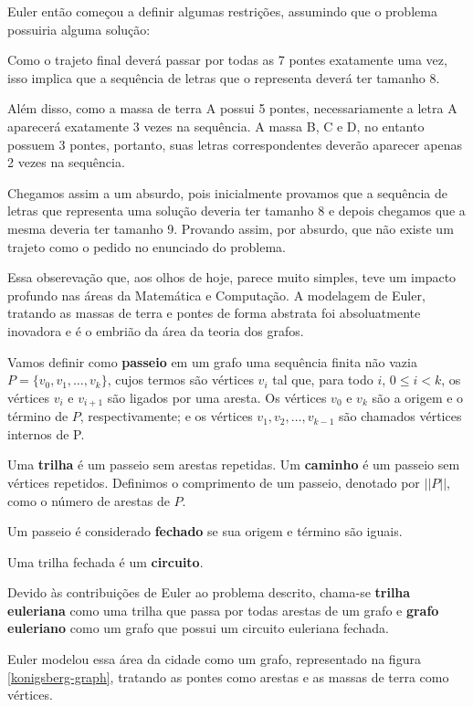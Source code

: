 \documentclass[12pt, a4paper]{article}
\begin{document}
Euler então começou a definir algumas restrições, assumindo que o problema possuiria alguma solução:

Como o trajeto final deverá passar por todas as 7 pontes exatamente uma vez, isso implica que a sequência de letras que o representa deverá ter tamanho 8.

Além disso, como a massa de terra A possui 5 pontes, necessariamente a letra A aparecerá exatamente 3 vezes na sequência.
A massa B, C e D, no entanto possuem 3 pontes, portanto, suas letras correspondentes deverão aparecer apenas 2 vezes na sequência. 

Chegamos assim a um absurdo, pois inicialmente provamos que a sequência de letras que representa uma solução deveria ter tamanho 8 e depois chegamos que a mesma deveria ter tamanho 9.
Provando assim, por absurdo, que não existe um trajeto como o pedido no enunciado do problema.


Essa obserevação que, aos olhos de hoje, parece muito simples, teve um impacto profundo nas áreas da Matemática e Computação.
A modelagem de Euler, tratando as massas de terra e pontes de forma abstrata foi absoluatmente inovadora e é o embrião da área da teoria dos grafos.


Vamos definir como \textbf{passeio} em um grafo uma sequência finita não vazia $P = \{ v_0, v_1, \dots, v_k\}$, cujos termos são vértices $v_i$ tal que, para todo $i$, $0 \leq i < k$, os vértices $v_{i}$ e $v_{i+1}$ são ligados por uma aresta. 
Os vértices $v_0$ e $v_k$ são a origem e o término de $P$, respectivamente; e os vértices $v_1, v_2, \dots, v_{k-1}$ são chamados vértices internos de P. 

Uma \textbf{trilha} é um passeio sem arestas repetidas. 
Um \textbf{caminho} é um passeio sem vértices repetidos.
Definimos o comprimento de um passeio, denotado por $||P||$, como o número de arestas de $P$.

Um passeio é considerado \textbf{fechado} se sua origem e término são iguais.

Uma trilha fechada é um \textbf{circuito}.

Devido às contribuições de Euler ao problema descrito, chama-se \textbf{trilha euleriana} como uma trilha que passa por todas arestas de um grafo e \textbf{grafo euleriano} como um grafo que possui um circuito euleriana fechada.

Euler modelou essa área da cidade como um grafo, representado na figura \ref{konigsberg-graph}, tratando as pontes como arestas e as massas de terra como vértices.
\end{document}
